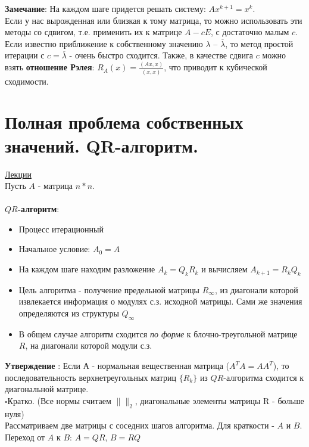 \documentclass[specialist, subf, href, colorlinks=true, 12pt, times, mtpro, final]{disser}
\theoremstyle{definition}
\begin{document}
	\textbf{Замечание}: На каждом шаге придется решать систему: $Ax^{k+1} = x^k$.
\\
Если у нас вырожденная или близкая к тому матрица, то можно использовать эти методы со сдвигом, т.е. применить их к матрице $A-cE$, с достаточно малым $c$.  Если известно приближение к собственному значению $\lambda$ \--- $\overline{\lambda}$, то метод простой итерации с $c = \overline{\lambda}$ - очень быстро сходится. Также, в качестве сдвига $c$ можно взять \textbf{отношение Рэлея}: $R_A(x) = \frac{(Ax, x)}{(x, x)}$, что приводит к кубической сходимости.
	
	

\section {Полная проблема собственных значений. QR-алгоритм.}
	\hyperlink {lects.79}{Лекции}\\
	
Пусть $A$ - матрица $n*n$.
\\
\\
\textbf{$QR$-алгоритм}:
\begin{itemize}
\item Процесс итерационный
\item Начальное условие: $A_0 = A$
\item На каждом шаге находим разложение $A_k = Q_kR_k$ и  вычисляем $A_{k+1} = R_k Q_k $
\item Цель алгоритма - получение предельной матрицы $R_{\infty}$, из диагонали которой извлекается информация о  модулях с.з. исходной матрицы. Сами же значения определяются из структуры $Q_{\infty}$

\item В общем случае алгоритм сходится \textit{по форме} к блочно-треугольной матрице $R$, на диагонали которой модули с.з.
\end{itemize}
\textbf{Утверждение }:
Если $А$ - нормальная вещественная матрица ($A^TA = AA^T$), то последовательность верхнетреугольных матриц $\{R_k\}$ из $QR$-алгоритма сходится к диагональной матрице.
\\
$\square$Кратко. (Все нормы считаем $\|\|_2$, диагональные элементы матрицы R - больше нуля)\\

Рассматриваем две матрицы с соседних шагов алгоритма. Для краткости - $A$ и $B$. \\
Переход от $A$ к $B$: $A = QR$, $B = RQ$\\
\end{document}
